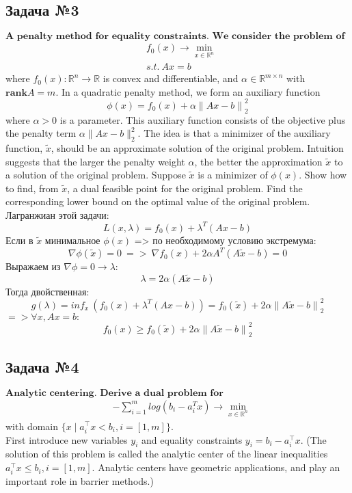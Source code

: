 \documentclass[12pt,letterpaper]{article}
\begin{document}
\subsection*{Задача №3}
$\textbf{A penalty method for equality constraints. We consider the problem of minimization}$
$$\begin{aligned}
&f_0(x) \rightarrow \min _{x \in \mathbb{R}^n} \\
&s.t.\ Ax=b
\end{aligned} $$
where \(f_0(x): \mathbb{R}^n \to\mathbb{R}\) is convex and differentiable, and \(\alpha \in \mathbb{R}^{m \times n}\) with \(\mathbf{rank }A = m\). In a quadratic penalty method, we form an auxiliary function
$$\phi(x)=f_0(x)+\alpha{\parallel Ax-b\parallel}^2_2$$
where \(\alpha > 0\) is a parameter. This auxiliary function consists of the objective plus the penalty term \(\alpha \|Ax - b\|_2^2\). The idea is that a minimizer of the auxiliary function, \(\tilde{x}\), should be an approximate solution of the original problem. Intuition suggests that the larger the penalty weight \(\alpha\), the better the approximation \(\tilde{x}\) to a solution of the original problem. Suppose \(\tilde{x}\) is a minimizer of \(\phi(x)\). Show how to find, from \(\tilde{x}\), a dual feasible point for the original problem. Find the corresponding lower bound on the optimal value of the original problem.\\

Лагранжиан этой задачи:
$$L(x,\lambda)=f_0(x)+{\lambda}^T(Ax-b)$$
Если в \(\tilde{x}\) минимальное $\phi(x)$ => по необходимому условию экстремума:
$$\nabla\phi(\tilde{x})=0\ =>\ \nabla f_0(x)+2\alpha A^T(A\tilde{x}-b)=0$$
Выражаем из $\nabla\phi=0 \rightarrow \lambda:$
$$\lambda=2\alpha(A\tilde{x}-b)$$
Тогда двойственная:
$$g(\lambda)={inf}_x\ (f_0(x)+{\lambda}^T(Ax-b))=f_0(\tilde{x})+2\alpha{\parallel A\tilde{x}-b\parallel}^2_2$$
$=> \forall x, Ax=b:$
$$f_0(x)\geqslant f_0(\tilde{x})+2\alpha{\parallel A\tilde{x}-b\parallel}^2_2$$


\subsection*{Задача №4}
$\textbf{Analytic centering. Derive a dual problem for}$
$$\begin{aligned}
&-\sum^{m}_{i=1}log(b_i-a^T_ix) \rightarrow \min _{x \in \mathbb{R}^n}
\end{aligned} $$
with domain \(\{x \mid a^\top_i x < b_i , i = [1,m]\}\).\\
First introduce new variables \(y_i\) and equality constraints \(y_i = b_i-a^\top_i x\). (The solution of this problem is called the analytic center of the linear inequalities \(a^\top_i x \leq b_i ,i = [1,m]\). Analytic centers have geometric applications, and play an important role in barrier methods.)
\end{document}
